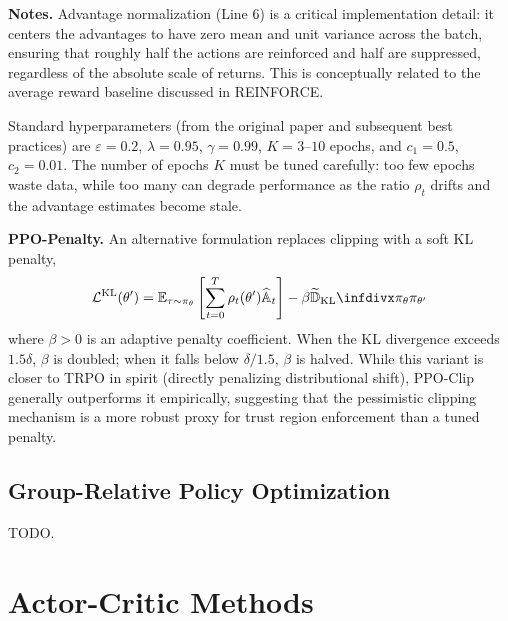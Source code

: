\documentclass[11pt, letterpaper]{article}
\begin{document}
\begin{remark}
    \textbf{Notes.} Advantage normalization (Line 6) is a critical implementation detail: it centers the advantages to have zero mean and unit variance across the batch, ensuring that roughly half the actions are reinforced and half are suppressed, regardless of the absolute scale of returns. This is conceptually related to the average reward baseline discussed in REINFORCE. 

    Standard hyperparameters (from the original paper and subsequent best practices) are \(\varepsilon = 0.2\), \(\lambda = 0.95\), \(\gamma = 0.99\), \(K = 3\text{--}10\) epochs, and \(c_1 = 0.5\), \(c_2 = 0.01\). The number of epochs \(K\) must be tuned carefully: too few epochs waste data, while too many can degrade performance as the ratio \(\rho_t\) drifts and the advantage estimates become stale.

    \textbf{PPO-Penalty.} An alternative formulation replaces clipping with a soft KL penalty, 
    \[
        \mathcal{L}^{\text{KL}}(\theta') = \mathbb{E}_{\tau \sim \pi_\theta}\left[\sum_{t=0}^T \rho_t(\theta') \widehat{\mathbb{A}}_t\right] - \beta \TKL{\pi_\theta}{\pi_{\theta'}}
    \]
    where \(\beta > 0\) is an adaptive penalty coefficient. When the KL divergence exceeds \(1.5\delta\), \(\beta\) is doubled; when it falls below \(\delta / 1.5\), \(\beta\) is halved. While this variant is closer to TRPO in spirit (directly penalizing distributional shift), PPO-Clip generally outperforms it empirically, suggesting that the pessimistic clipping mechanism is a more robust proxy for trust region enforcement than a tuned penalty.
\end{remark}

\subsection{Group-Relative Policy Optimization}

TODO. 

\newpage
\section{Actor-Critic Methods}
\end{document}
